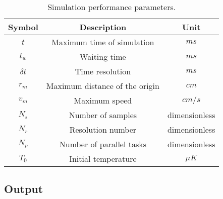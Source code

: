 \begin{table}[!ht]
    \centering
    \caption{Simulation performance parameters.}
    \begin{tabular}{|c|c|c|}
        \hline
        \textbf{Symbol} & \textbf{Description} & \textbf{Unit} \\ \hline
        $ t $ & Maximum time of simulation & $ ms $ \\
        $ t_{w} $ & Waiting time & $ ms $ \\
        $ \delta t $ & Time resolution & $ ms $ \\
        $ r_{m} $ & Maximum distance of the origin & $ cm $ \\
        $ v_{m} $ & Maximum speed & $ cm / s $ \\
        $ N_{s} $ & Number of samples & dimensionless \\
        $ N_{r} $ & Resolution number & dimensionless \\
        $ N_{p} $ & Number of parallel tasks & dimensionless \\
        $ T_0 $ & Initial temperature & $ \mu K $ \\
        \hline
    \end{tabular}
    \vspace{10px}
    \label{tab:performance-parameters}
\end{table}

\subsection{Output}
\label{sec:output}

